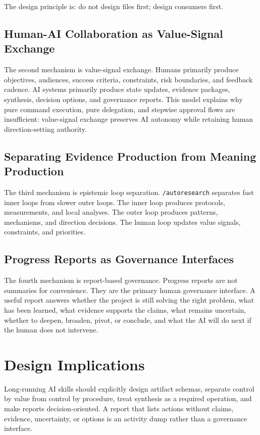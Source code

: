 \documentclass[11pt]{article}
\begin{document}
The design principle is: do not design files first; design consumers first.

\subsection{Human-AI Collaboration as Value-Signal Exchange}

The second mechanism is value-signal exchange. Humans primarily produce objectives, audiences, success criteria, constraints, risk boundaries, and feedback cadence. AI systems primarily produce state updates, evidence packages, synthesis, decision options, and governance reports. This model explains why pure command execution, pure delegation, and stepwise approval flows are insufficient: value-signal exchange preserves AI autonomy while retaining human direction-setting authority.

\subsection{Separating Evidence Production from Meaning Production}

The third mechanism is epistemic loop separation. \texttt{/autoresearch} separates fast inner loops from slower outer loops. The inner loop produces protocols, measurements, and local analyses. The outer loop produces patterns, mechanisms, and direction decisions. The human loop updates value signals, constraints, and priorities.

\subsection{Progress Reports as Governance Interfaces}

The fourth mechanism is report-based governance. Progress reports are not summaries for convenience. They are the primary human governance interface. A useful report answers whether the project is still solving the right problem, what has been learned, what evidence supports the claims, what remains uncertain, whether to deepen, broaden, pivot, or conclude, and what the AI will do next if the human does not intervene.

\section{Design Implications}

Long-running AI skills should explicitly design artifact schemas, separate control by value from control by procedure, treat synthesis as a required operation, and make reports decision-oriented. A report that lists actions without claims, evidence, uncertainty, or options is an activity dump rather than a governance interface.
\end{document}

